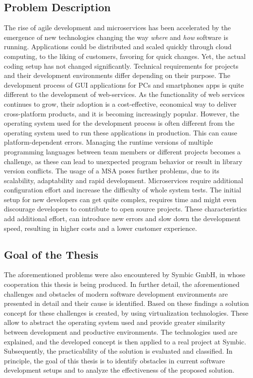     \subsection{Problem Description}
    The rise of agile development and microservices has been accelerated by the emergence of new technologies changing the way \textit{where} and \textit{how} software is running. Applications could be distributed and scaled quickly through cloud computing, to the liking of customers, favoring for quick changes. Yet, the actual coding setup has not changed significantly.\newline
    Technical requirements for projects and their development environments differ depending on their purpose. The development process of \ac{GUI} applications for PCs and smartphones apps is quite different to the development of web-services. As the functionality of web services continues to grow, their adoption is a cost-effective, economical way to deliver cross-platform products, and it is becoming increasingly popular. However, the operating system used for the development process is often different from the operating system used to run these applications in production. This can cause platform-dependent errors. Managing the runtime versions of multiple programming languages between team members or different projects becomes a challenge, as these can lead to unexpected program behavior or result in library version conflicts. The usage of a \acl{MSA} poses further problems, due to its scalability, adaptability and rapid development. Microservices require additional configuration effort and increase the difficulty of whole system tests. The initial setup for new developers can get quite complex, requires time and might even discourage developers to contribute to open source projects.\newline
    These characteristics add additional effort, can introduce new errors and slow down the development speed, resulting in higher costs and a lower customer experience.

    \subsection{Goal of the Thesis}
    The aforementioned problems were also encountered by Symbic GmbH, in whose cooperation this thesis is being produced. In further detail, the aforementioned challenges and obstacles of modern software development environments are presented in detail and their cause is identified. Based on these findings a solution concept for these challenges is created, by using virtualization technologies. These allow to abstract the operating system used and provide greater similarity between development and productive environments. The technologies used are explained, and the developed concept is then applied to a real project at Symbic. Subsequently, the practicability of the solution is evaluated and classified. In principle, the goal of this thesis is to identify obstacles in current software development setups and to analyze the effectiveness of the proposed solution.

